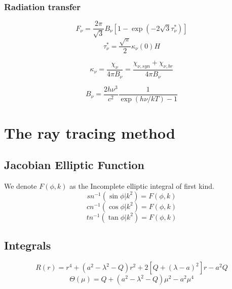 \documentclass[12pt]{book}
\begin{document}
\subsection{Radiation transfer}
\begin{equation}
F_\nu=\frac{2\pi}{\sqrt{3}}B_\nu[1-\exp(-2\sqrt{3}\tau^{*}_\nu)]
\end{equation}
\begin{equation}
\tau^*_\nu=\frac{\sqrt{\pi}}{2}\kappa_\nu(0)H
\end{equation}

\begin{equation}
\kappa_\nu=\frac{\chi_\nu}{4\pi B_\nu}=\frac{\chi_{\nu,syn}+\chi_{\nu,br}}{4\pi B_\nu}
\end{equation}

\begin{equation}
B_\nu=\frac{2h\nu^3}{c^2}\frac{1}{\exp(h\nu/kT)-1}
\end{equation}

\chapter{The ray tracing method}

\section{Jacobian Elliptic Function}
We denote $F(\phi, k)$ as the Incomplete elliptic integral of first kind.
\begin{equation}
sn^{-1}(\sin\phi|k^2)=F(\phi,k)
\end{equation}
\begin{equation}
cn^{-1}(\cos\phi| k^2)=F(\phi,k)
\end{equation}
\begin{equation}
tn^{-1}(\tan\phi|k^2)=F(\phi,k)
\end{equation}
\section{Integrals}
\begin{equation}
R(r)=r^4+(a^2-\lambda^2-Q)r^2+2[Q+(\lambda-a)^2]r-a^2Q
\end{equation}
\begin{equation}
\Theta(\mu)=Q+(a^2-\lambda^2-Q)\mu^2-a^2\mu^4
\end{equation}
\end{document}
